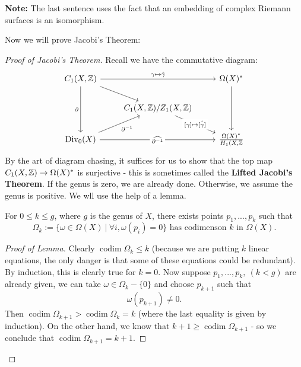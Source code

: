 \documentclass{article}
\begin{document}
{\begin{corollary}
    \textbf{Note: } The last sentence uses the fact that an embedding of complex Riemann surfaces is an isomorphism.
\end{corollary}

Now we will prove Jacobi's Theorem:
\begin{proof}[Proof of Jacobi's Theorem]
 Recall we have the commutative diagram:
\[\begin{tikzcd}
	{C_1(X, \Zbb)} && {\Omega(X)^*} \\
	& {C_1(X, \Zbb)/Z_1(X, \Zbb)} \\
	{\operatorname{Div}_0(X)} && {\frac{\Omega(X)^*}{H_1(X, \Zbb}}
	\arrow["{\gamma \mapsto \hat{\gamma}}", from=1-1, to=1-3]
	\arrow[from=1-1, to=2-2]
	\arrow["\partial"', from=1-1, to=3-1]
	\arrow[from=1-3, to=3-3]
	\arrow["{[\gamma] \mapsto \hat{[\gamma]}}"{description}, from=2-2, to=3-3]
	\arrow["{\partial^{-1}}"', from=3-1, to=2-2]
	\arrow["{\widehat{\partial^{-1}}}"{description}, from=3-1, to=3-3]
\end{tikzcd}\]
By the art of diagram chasing, it suffices for us to show that the top map $C_1(X, \mathbb{Z}) \to \Omega(X)^*$ is surjective - this is sometimes called the \textbf{Lifted Jacobi's Theorem}. If the genus is zero, we are already done. Otherwise, we assume the genus is positive. We wll use the help of a lemma. 

\begin{lemma}
    For $0 \leq k \leq g$, where $g$ is the genus of $X$, there exists points $p_1, ..., p_k$ such that 
    \[\Omega_k := \{\omega \in \Omega(X)\ |\ \forall i, \omega(p_i) = 0\} \text{ has codimenson $k$ in $\Omega(X)$}.\]
\end{lemma}

\begin{proof}[Proof of Lemma]
    Clearly $\operatorname{codim} \Omega_k \leq k$ (because we are putting $k$ linear equations, the only danger is that some of these equations could be redundant). By induction, this is clearly true for $k = 0$. Now suppose $p_1, ..., p_k,\ (k < g)$ are already given, we can take $\omega \in \Omega_k - \{0\}$ and choose $p_{k+1}$ such that
    \[\omega(p_{k+1}) \neq 0.\]
    Then $\operatorname{codim} \Omega_{k+1} > \operatorname{codim} \Omega_k = k$ (where the last equality is given by induction). On the other hand, we know that $k+1 \geq \operatorname{codim} \Omega_{k+1}$ - so we conclude that $\operatorname{codim} \Omega_{k+1} = k+1$.
\end{proof}


\end{proof}}
\end{document}
